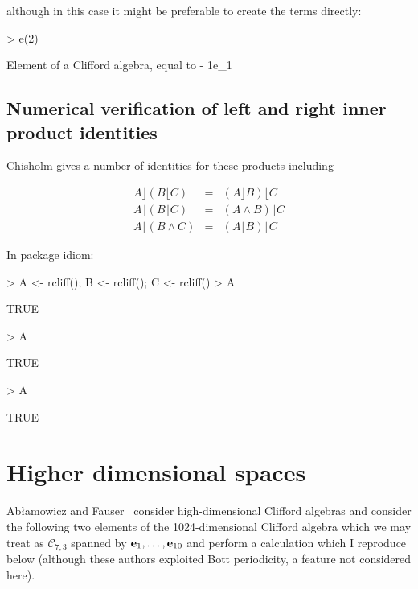 \documentclass{birkjour}
\theoremstyle{definition}
\theoremstyle{remark}
\numberwithin{equation}{section}
\begin{document}
although in this case it might be preferable to create the terms directly:

\begin{Schunk}
\begin{Sinput}
> e(2) %
\end{Sinput}
\begin{Soutput}
Element of a Clifford algebra, equal to
- 1e_1
\end{Soutput}
\end{Schunk}


\subsection{Numerical verification of left and right inner product identities}

Chisholm gives a number of identities for these products including

\begin{eqnarray}
  A\rfloor(B\lfloor C) &=& (A\rfloor B)\lfloor C\\
  A\rfloor(B\rfloor C) &=& (A\wedge B)\rfloor C\\
  A\lfloor(B\wedge  C) &=& (A\lfloor B)\lfloor C
\end{eqnarray}

In package idiom:

\begin{Schunk}
\begin{Sinput}
> A <- rcliff();  B <- rcliff();  C <- rcliff()
> A %
\end{Sinput}
\begin{Soutput}
[1] TRUE
\end{Soutput}
\begin{Sinput}
> A %
\end{Sinput}
\begin{Soutput}
[1] TRUE
\end{Soutput}
\begin{Sinput}
> A %
\end{Sinput}
\begin{Soutput}
[1] TRUE
\end{Soutput}
\end{Schunk}
\section{Higher dimensional spaces}

Ab\l{}amowicz and Fauser~\cite{ablamowicz2012} consider
high-dimensional Clifford algebras and consider the following two
elements of the 1024-dimensional Clifford algebra which we may treat
as ${\mathcal C}_{7,3}$ spanned by ${\bf e}_{1},\ldots,{\bf e}_{10}$ and perform
a calculation which I reproduce below (although these authors
exploited Bott periodicity, a feature not considered here).
\end{document}
